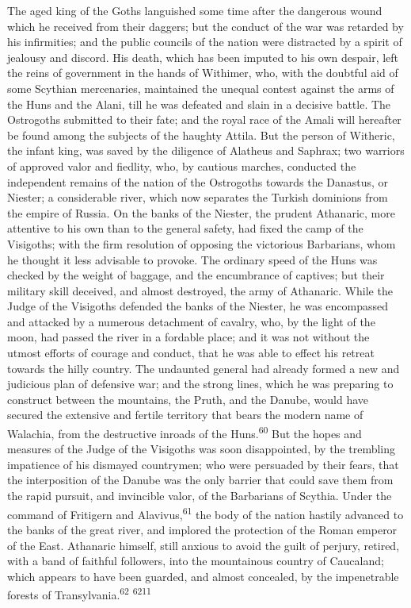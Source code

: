 The aged king of the Goths languished some time after the
dangerous wound which he received from their daggers; but the
conduct of the war was retarded by his infirmities; and the
public councils of the nation were distracted by a spirit of
jealousy and discord. His death, which has been imputed to his
own despair, left the reins of government in the hands of
Withimer, who, with the doubtful aid of some Scythian
mercenaries, maintained the unequal contest against the arms of
the Huns and the Alani, till he was defeated and slain in a
decisive battle. The Ostrogoths submitted to their fate; and the
royal race of the Amali will hereafter be found among the
subjects of the haughty Attila. But the person of Witheric, the
infant king, was saved by the diligence of Alatheus and Saphrax;
two warriors of approved valor and fiedlity, who, by cautious
marches, conducted the independent remains of the nation of the
Ostrogoths towards the Danastus, or Niester; a considerable
river, which now separates the Turkish dominions from the empire
of Russia. On the banks of the Niester, the prudent Athanaric,
more attentive to his own than to the general safety, had fixed
the camp of the Visigoths; with the firm resolution of opposing
the victorious Barbarians, whom he thought it less advisable to
provoke. The ordinary speed of the Huns was checked by the weight
of baggage, and the encumbrance of captives; but their military
skill deceived, and almost destroyed, the army of Athanaric.
While the Judge of the Visigoths defended the banks of the
Niester, he was encompassed and attacked by a numerous detachment
of cavalry, who, by the light of the moon, had passed the river
in a fordable place; and it was not without the utmost efforts of
courage and conduct, that he was able to effect his retreat
towards the hilly country. The undaunted general had already
formed a new and judicious plan of defensive war; and the strong
lines, which he was preparing to construct between the mountains,
the Pruth, and the Danube, would have secured the extensive and
fertile territory that bears the modern name of Walachia, from
the destructive inroads of the Huns.\textsuperscript{60} But the hopes and
measures of the Judge of the Visigoths was soon disappointed, by
the trembling impatience of his dismayed countrymen; who were
persuaded by their fears, that the interposition of the Danube
was the only barrier that could save them from the rapid pursuit,
and invincible valor, of the Barbarians of Scythia. Under the
command of Fritigern and Alavivus,\textsuperscript{61} the body of the nation
hastily advanced to the banks of the great river, and implored
the protection of the Roman emperor of the East. Athanaric
himself, still anxious to avoid the guilt of perjury, retired,
with a band of faithful followers, into the mountainous country
of Caucaland; which appears to have been guarded, and almost
concealed, by the impenetrable forests of Transylvania.\textsuperscript{62} \textsuperscript{6211}


